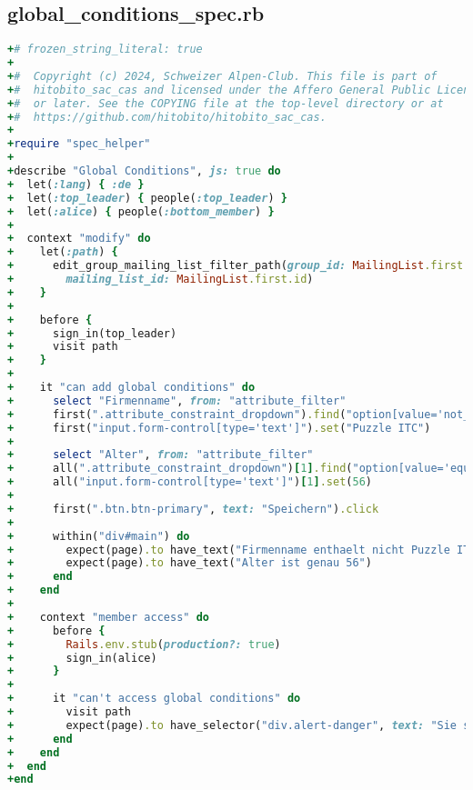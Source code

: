 \subsection{global\_conditions\_spec.rb}
\begin{lstlisting}[language=Ruby]
+# frozen_string_literal: true
+
+#  Copyright (c) 2024, Schweizer Alpen-Club. This file is part of
+#  hitobito_sac_cas and licensed under the Affero General Public License version 3
+#  or later. See the COPYING file at the top-level directory or at
+#  https://github.com/hitobito/hitobito_sac_cas.
+
+require "spec_helper"
+
+describe "Global Conditions", js: true do
+  let(:lang) { :de }
+  let(:top_leader) { people(:top_leader) }
+  let(:alice) { people(:bottom_member) }
+
+  context "modify" do
+    let(:path) {
+      edit_group_mailing_list_filter_path(group_id: MailingList.first.group_id,
+        mailing_list_id: MailingList.first.id)
+    }
+
+    before {
+      sign_in(top_leader)
+      visit path
+    }
+
+    it "can add global conditions" do
+      select "Firmenname", from: "attribute_filter"
+      first(".attribute_constraint_dropdown").find("option[value='not_match']").select_option
+      first("input.form-control[type='text']").set("Puzzle ITC")
+
+      select "Alter", from: "attribute_filter"
+      all(".attribute_constraint_dropdown")[1].find("option[value='equal']").select_option
+      all("input.form-control[type='text']")[1].set(56)
+
+      first(".btn.btn-primary", text: "Speichern").click
+
+      within("div#main") do
+        expect(page).to have_text("Firmenname enthaelt nicht Puzzle ITC")
+        expect(page).to have_text("Alter ist genau 56")
+      end
+    end
+
+    context "member access" do
+      before {
+        Rails.env.stub(production?: true)
+        sign_in(alice)
+      }
+
+      it "can't access global conditions" do
+        visit path
+        expect(page).to have_selector("div.alert-danger", text: "Sie sind nicht berechtigt, diese Seite anzuzeigen")
+      end
+    end
+  end
+end
\end{lstlisting}

\newpage

